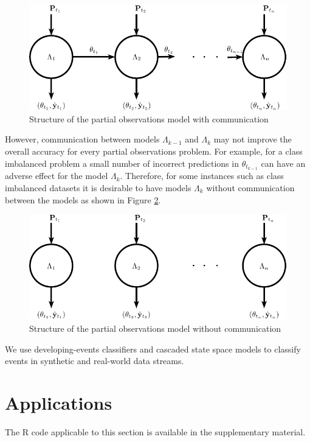 \documentclass[11pt]{article}
\begin{document}
	\begin{figure}[H]
	\centering
	\includegraphics[clip=true,scale=0.8]{./Graphics/Lots_of_circles_3.pdf}
	\caption{\footnotesize Structure of the partial observations model with communication}
	\label{fig:PODLM}
	\end{figure}
	 
	 
	However, communication between models $\Lambda_{k-1}$ and $\Lambda_k$ may not improve the overall accuracy for every partial observations problem. For example, for a class imbalanced problem a small number of incorrect predictions in $\theta_{t_{k-1}}$ can have an adverse effect for the model $\Lambda_k$. Therefore, for some instances such as class imbalanced datasets it is desirable to have  models $\Lambda_k$ without communication between the models as shown in Figure \ref{fig:PODLM2}.  
	
	
	\begin{figure}[H]
	\centering
	\includegraphics[clip=true,scale=0.8]{./Graphics/Lots_of_circles_4.pdf}
	\caption{\footnotesize Structure of the partial observations model without communication}
	\label{fig:PODLM2}
	\end{figure}
	
	We use developing-events classifiers and  cascaded state space models to classify events in synthetic and real-world data streams. 

	\section{Applications} \label{sec:Experiments}
	The R code applicable to this section is available in the supplementary material.
\end{document}
